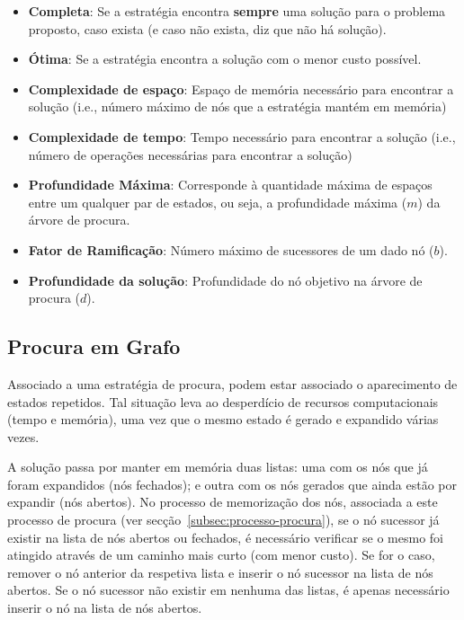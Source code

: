 \begin{itemize}
    \item \textbf{Completa}: Se a estratégia encontra \textbf{sempre} uma solução para o problema proposto, caso exista (e caso não exista, diz que não há solução).
    \item \textbf{Ótima}: Se a estratégia encontra a solução com o menor custo possível.
    \item \textbf{Complexidade de espaço}: Espaço de memória necessário para encontrar a solução (i.e., número máximo de nós que a estratégia mantém em memória)
    \item \textbf{Complexidade de tempo}: Tempo necessário para encontrar a solução (i.e., número de operações necessárias para encontrar a solução)
    \item \textbf{Profundidade Máxima}: Corresponde à quantidade máxima de espaços entre um qualquer par de estados, ou seja, a profundidade máxima ($m$) da árvore de procura.
    \item \textbf{Fator de Ramificação}: Número máximo de sucessores de um dado nó ($b$).
    \item \textbf{Profundidade da solução}: Profundidade do nó objetivo na árvore de procura ($d$).
\end{itemize}

\subsection{Procura em Grafo}\label{subsec:procura-grafo}

Associado a uma estratégia de procura, podem estar associado o aparecimento de estados repetidos.
Tal situação leva ao desperdício de recursos computacionais (tempo e memória), uma vez que o mesmo estado é gerado e expandido várias vezes.

A solução passa por manter em memória duas listas: uma com os nós que já foram expandidos (nós fechados); e outra com os nós gerados que ainda estão por expandir (nós abertos).
No processo de memorização dos nós, associada a este processo de procura (ver secção~\ref{subsec:processo-procura}), se o nó sucessor já existir na lista de nós abertos ou fechados, é necessário verificar se o mesmo foi atingido através de um caminho mais curto (com menor custo).
Se for o caso, remover o nó anterior da respetiva lista e inserir o nó sucessor na lista de nós abertos.
Se o nó sucessor não existir em nenhuma das listas, é apenas necessário inserir o nó na lista de nós abertos.

